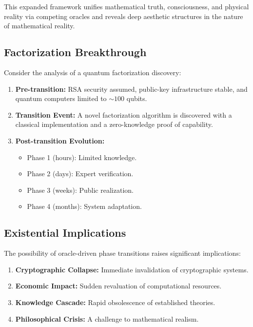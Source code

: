 \documentclass[11pt]{article}
\begin{document}
This expanded framework unifies mathematical truth, consciousness, and physical reality via competing oracles and reveals deep aesthetic structures in the nature of mathematical reality.

\subsection{Factorization Breakthrough}

Consider the analysis of a quantum factorization discovery:
\begin{enumerate}[label=(\arabic*)]
    \item \textbf{Pre-transition:} RSA security assumed, public-key infrastructure stable, and quantum computers limited to $\sim100$ qubits.
    \item \textbf{Transition Event:} A novel factorization algorithm is discovered with a classical implementation and a zero-knowledge proof of capability.
    \item \textbf{Post-transition Evolution:}
    \begin{itemize}
        \item Phase 1 (hours): Limited knowledge.
        \item Phase 2 (days): Expert verification.
        \item Phase 3 (weeks): Public realization.
        \item Phase 4 (months): System adaptation.
    \end{itemize}
\end{enumerate}

\subsection{Existential Implications}

The possibility of oracle-driven phase transitions raises significant implications:
\begin{enumerate}[label=(\arabic*)]
    \item \textbf{Cryptographic Collapse:} Immediate invalidation of cryptographic systems.
    \item \textbf{Economic Impact:} Sudden revaluation of computational resources.
    \item \textbf{Knowledge Cascade:} Rapid obsolescence of established theories.
    \item \textbf{Philosophical Crisis:} A challenge to mathematical realism.
\end{enumerate}
\end{document}
